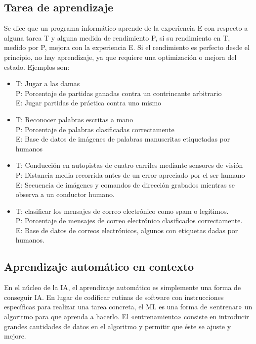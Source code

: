\subsection{Tarea de aprendizaje}
Se dice que un programa informático aprende de la experiencia E con respecto a alguna tarea T y alguna medida de rendimiento P, si su rendimiento en T, medido por P, mejora con la experiencia E. Si el rendimiento es perfecto desde el principio, no hay aprendizaje, ya que requiere una optimización o mejora del estado. Ejemplos son:
\begin{itemize}
\item T: Jugar a las damas \\ P: Porcentaje de partidas ganadas contra un contrincante arbitrario \\ E: Jugar partidas de práctica contra uno mismo
\item T: Reconocer palabras escritas a mano \\ P: Porcentaje de palabras clasificadas correctamente \\ E: Base de datos de imágenes de palabras manuscritas etiquetadas por humanos
\item T: Conducción en autopistas de cuatro carriles mediante sensores de visión \\ P: Distancia media recorrida antes de un error apreciado por el ser humano \\ E: Secuencia de imágenes y comandos de dirección grabados mientras se observa a un conductor humano.
\item T: clasificar los mensajes de correo electrónico como spam o legítimos. \\ P: Porcentaje de mensajes de correo electrónico clasificados correctamente. \\ E: Base de datos de correos electrónicos, algunos con etiquetas dadas por humanos.
\end{itemize}

\subsection{Aprendizaje automático en contexto}
En el núcleo de la IA, el aprendizaje automático es simplemente una forma de conseguir IA. En lugar de codificar rutinas de software con instrucciones específicas para realizar una tarea concreta, el ML es una forma de «entrenar» un algoritmo para que aprenda a hacerlo. El «entrenamiento» consiste en introducir grandes cantidades de datos en el algoritmo y permitir que éste se ajuste y mejore.

